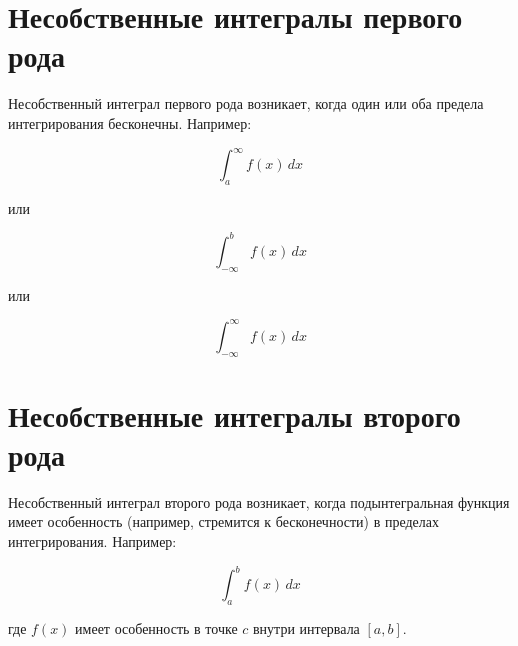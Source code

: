 \documentclass{article}
\begin{document}
\section{Несобственные интегралы первого рода}

Несобственный интеграл первого рода возникает, когда один или оба предела интегрирования бесконечны. Например:

\[
\int_{a}^{\infty} f(x) \, dx
\]

или

\[
\int_{-\infty}^{b} f(x) \, dx
\]

или

\[
\int_{-\infty}^{\infty} f(x) \, dx
\]

\section{Несобственные интегралы второго рода}

Несобственный интеграл второго рода возникает, когда подынтегральная функция имеет особенность (например, стремится к бесконечности) в пределах интегрирования. Например:

\[
\int_{a}^{b} f(x) \, dx
\]

где \( f(x) \) имеет особенность в точке \( c \) внутри интервала \([a, b]\).
\end{document}
